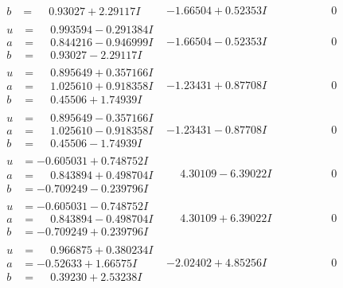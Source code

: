 \documentclass[1p]{elsarticle_modified}
\theoremstyle{definition}
\begin{document}
$$\begin{array}{c|c|c}
\begin{aligned}
b &= \phantom{-}0.93027 + 2.29117 I\end{aligned}
 & -1.66504 + 0.52353 I & \phantom{-0.000000 } 0 \\ \hline\begin{aligned}
u &= \phantom{-}0.993594 - 0.291384 I \\
a &= \phantom{-}0.844216 - 0.946999 I \\
b &= \phantom{-}0.93027 - 2.29117 I\end{aligned}
 & -1.66504 - 0.52353 I & \phantom{-0.000000 } 0 \\ \hline\begin{aligned}
u &= \phantom{-}0.895649 + 0.357166 I \\
a &= \phantom{-}1.025610 + 0.918358 I \\
b &= \phantom{-}0.45506 + 1.74939 I\end{aligned}
 & -1.23431 + 0.87708 I & \phantom{-0.000000 } 0 \\ \hline\begin{aligned}
u &= \phantom{-}0.895649 - 0.357166 I \\
a &= \phantom{-}1.025610 - 0.918358 I \\
b &= \phantom{-}0.45506 - 1.74939 I\end{aligned}
 & -1.23431 - 0.87708 I & \phantom{-0.000000 } 0 \\ \hline\begin{aligned}
u &= -0.605031 + 0.748752 I \\
a &= \phantom{-}0.843894 + 0.498704 I \\
b &= -0.709249 - 0.239796 I\end{aligned}
 & \phantom{-}4.30109 - 6.39022 I & \phantom{-0.000000 } 0 \\ \hline\begin{aligned}
u &= -0.605031 - 0.748752 I \\
a &= \phantom{-}0.843894 - 0.498704 I \\
b &= -0.709249 + 0.239796 I\end{aligned}
 & \phantom{-}4.30109 + 6.39022 I & \phantom{-0.000000 } 0 \\ \hline\begin{aligned}
u &= \phantom{-}0.966875 + 0.380234 I \\
a &= -0.52633 + 1.66575 I \\
b &= \phantom{-}0.39230 + 2.53238 I\end{aligned}
 & -2.02402 + 4.85256 I & \phantom{-0.000000 } 0 \\ \hline\begin{aligned}

\end{aligned}
\end{array}$$
\end{document}
